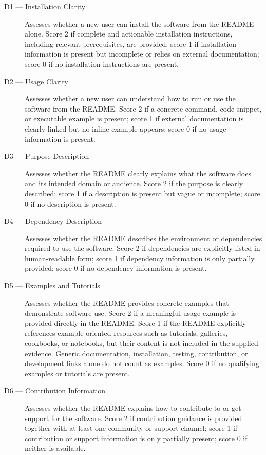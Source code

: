 \begin{description}
\item[D1 --- Installation Clarity] Assesses whether a new user can
install the software from the README alone. Score 2 if complete and
actionable installation instructions, including relevant
prerequisites, are provided; score 1 if installation information is
present but incomplete or relies on external documentation; score 0
if no installation instructions are present.

\item[D2 --- Usage Clarity] Assesses whether a new user can 
understand how to run or use the software from the README. Score 
2 if a concrete command, code snippet, or executable example is 
present; score 1 if external documentation is clearly linked but 
no inline example appears; score 0 if no usage information is 
present.

\item[D3 --- Purpose Description] Assesses whether the README 
clearly explains what the software does and its intended domain or 
audience. Score 2 if the purpose is clearly described; score 1 if 
a description is present but vague or incomplete; score 0 if no 
description is present.

\item[D4 --- Dependency Description] Assesses whether the README 
describes the environment or dependencies required to use the 
software. Score 2 if dependencies are explicitly listed in 
human-readable form; score 1 if dependency information is only 
partially provided; score 0 if no dependency information is present.

\item[D5 --- Examples and Tutorials] Assesses whether the README
provides concrete examples that demonstrate software use. Score 2 if
a meaningful usage example is provided directly in the README.
Score 1 if the README explicitly references example-oriented
resources such as tutorials, galleries, cookbooks, or notebooks, but
their content is not included in the supplied evidence. Generic
documentation, installation, testing, contribution, or development
links alone do not count as examples. Score 0 if no qualifying
examples or tutorials are present.

\item[D6 --- Contribution Information] Assesses whether the README 
explains how to contribute to or get support for the software. 
Score 2 if contribution guidance is provided together with at 
least one community or support channel; score 1 if contribution 
or support information is only partially present; score 0 if 
neither is available.
\end{description}

